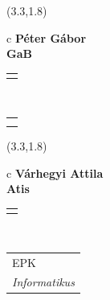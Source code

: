 \documentclass[11pt]{article}
\begin{document}
\makebox(3.3,1.8){
  \renewcommand\arraystretch{1.3}
  \begin{tabular}[c]{c}
    \hspace{8.5mm}
    \LARGE\bf{ Péter Gábor }\\
    \hspace{8.5mm}
    \Large{ GaB }\\
    \renewcommand\arraystretch{3}
    \begin{tabular}[c]{c}
      \centering
      \fontfamily{phv}\selectfont{
        \textbf{
          \textsc{
            \scriptsize{
            \color{Bright}{ Ismerkedő }\color{Bright}{ Webmester }\color{Bright}{ Sminkmester }\color{Dark}{ Programozó }
            }
          }
        }
      }
    \end{tabular}
    \\
    \renewcommand\arraystretch{1}
    \begin{tabular}{p{3.3in}}
      \hspace{.7cm}\\
      \hspace{.7cm}\emph{  }\\
    \end{tabular}
  \end{tabular}
}

\makebox(3.3,1.8){
  \renewcommand\arraystretch{1.3}
  \begin{tabular}[c]{c}
    \hspace{8.5mm}
    \LARGE\bf{ Várhegyi Attila }\\
    \hspace{8.5mm}
    \Large{ Atis }\\
    \renewcommand\arraystretch{3}
    \begin{tabular}[c]{c}
      \centering
      \fontfamily{phv}\selectfont{
        \textbf{
          \textsc{
            \scriptsize{
            \color{Dark}{ Ismerkedő }\color{Bright}{ Webmester }\color{Bright}{ Sminkmester }\color{Bright}{ Programozó }
            }
          }
        }
      }
    \end{tabular}
    \\
    \renewcommand\arraystretch{1}
    \begin{tabular}{p{3.3in}}
      \hspace{.7cm}EPK\\
      \hspace{.7cm}\emph{ Informatikus }\\
    \end{tabular}
  \end{tabular}
}
\end{document}
